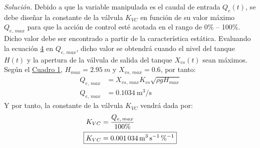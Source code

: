 \textit{Solución.} Debido a que la variable manipulada es el caudal de entrada $Q _{e}(t)$, se debe diseñar la constante de la válvula $K _{VC}$ en función de su valor máximo $Q _{e,\,max}$ para que la acción de control esté acotada en el rango de 0\% -- 100\%. Dicho valor debe ser encontrado a partir de la característica estática. Evaluando la ecuación \hyperref[qe]{4} en $Q _{e,\,max}$, dicho valor se obtendrá cuando el nivel del tanque $H (t)$ y la apertura de la válvula de salida del tanque $X _{vs} (t)$ sean máximos. Según el \hyperref[t1]{Cuadro 1}, $H _{max} = \SI{2.95}{m}$ y $X _{vs,\,max} = 0.6$, por tanto:
\begin{align*}
    Q _{e,\,max} &= X _{vs,\,max} K _{vs} \sqrt{\rho g H _{max}}\\
    Q _{e,\,max} &= \SI{0.1034}{\metre\cubed\per\second}
\end{align*}
Y por tanto, la constante de la válvula $K _{VC}$ vendrá dada por:
\begin{align*}
    K _{VC} &= \frac{Q _{e,\,max}}{100\%}\\
    \Aboxed{K _{VC} &= \SI{0.001034}{\metre\cubed\per\second\per\percent}}
\end{align*}
\newpage

